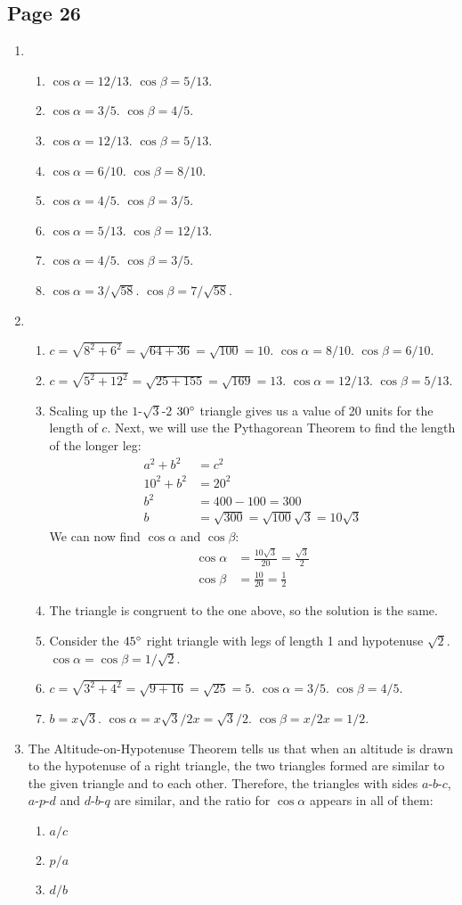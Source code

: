 \documentclass{article}
\newenvironment{solutions}[1]
{\subsection*{#1}
 \begin{enumerate}[leftmargin=1.5em]}
{\end{enumerate}}
\newcommand{\solution}{\item}
\newenvironment{subsolutions}
{\begin{enumerate}}
{\end{enumerate}}
\newcommand{\subsolution}{\item}
\begin{document}
\begin{solutions}{Page 26}
\solution %
\begin{subsolutions}
\subsolution
$\cos{\alpha} = 12/13$.
$\cos{\beta} = 5/13$.
\subsolution
$\cos{\alpha} = 3/5$.
$\cos{\beta} = 4/5$.
\subsolution
$\cos{\alpha} = 12/13$.
$\cos{\beta} = 5/13$.
\subsolution
$\cos{\alpha} = 6/10$.
$\cos{\beta} = 8/10$.
\subsolution
$\cos{\alpha} = 4/5$.
$\cos{\beta} = 3/5$.
\subsolution
$\cos{\alpha} = 5/13$.
$\cos{\beta} = 12/13$.
\subsolution
$\cos{\alpha} = 4/5$.
$\cos{\beta} = 3/5$.
\subsolution
$\cos{\alpha} = 3/\sqrt{58}$.
$\cos{\beta} = 7/\sqrt{58}$.
\end{subsolutions}

\solution %
\begin{subsolutions}
\subsolution
$c = \sqrt{8^2 + 6^2} = \sqrt{64 + 36} = \sqrt{100} = 10$.
$\cos{\alpha} = 8/10$.
$\cos{\beta} = 6/10$.
\subsolution
$c = \sqrt{5^2 + 12^2} = \sqrt{25 + 155} = \sqrt{169} = 13$.
$\cos{\alpha} = 12/13$.
$\cos{\beta} = 5/13$.
\subsolution
Scaling up the $1$-$\sqrt{3}$-$2$ $30\degree$ triangle gives us a value of 20 units for the length of $c$.
Next, we will use the Pythagorean Theorem to find the length of the longer leg:
\begin{align*}
a^2 + b^2 &= c^2\\
10^2 + b^2 &= 20^2\\
b^2 &= 400 - 100 = 300\\
b &= \sqrt{300} = \sqrt{100}\sqrt{3} = 10\sqrt{3}
\end{align*}
We can now find $\cos{\alpha}$ and $\cos{\beta}$:
\begin{align*}
\cos{\alpha} &= \frac{10\sqrt{3}}{20} = \frac{\sqrt{3}}{2}\\
\cos{\beta} &= \frac{10}{20} = \frac{1}{2}
\end{align*}
\subsolution
The triangle is congruent to the one above, so the solution is the same.
\subsolution
Consider the $45\degree$ right triangle with legs of length 1 and hypotenuse $\sqrt{2}$. $\cos{\alpha} = \cos{\beta} = 1/\sqrt{2}$.
\subsolution
$c = \sqrt{3^2 + 4^2} = \sqrt{9 + 16} = \sqrt{25} = 5$.
$\cos{\alpha} = 3/5$. $\cos{\beta} = 4/5$.
\subsolution
$b = x\sqrt{3}$.
$\cos{\alpha} = x\sqrt{3}/2x = \sqrt{3}/2$.
$\cos{\beta} = x/2x = 1/2$.
\end{subsolutions}

\solution %
The Altitude-on-Hypotenuse Theorem tells us that when an altitude is drawn to the hypotenuse of a right triangle, the two triangles formed are similar to the given triangle and to each other. Therefore, the triangles with sides $a$-$b$-$c$, $a$-$p$-$d$ and $d$-$b$-$q$ are similar, and the ratio for $\cos{\alpha}$ appears in all of them:
\begin{subsolutions}
\subsolution $a/c$
\subsolution $p/a$
\subsolution $d/b$
\end{subsolutions}

\end{solutions}
\end{document}
